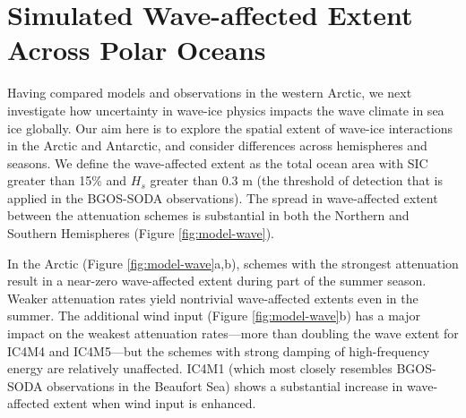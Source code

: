 \documentclass [11pt, proquest] {uwthesis}[2020/02/24]
\begin{document}
\section{Simulated Wave-affected Extent Across Polar Oceans} \label{model-waveextent}


Having compared models and observations in the western Arctic, we next investigate how uncertainty in wave-ice physics impacts the wave climate in sea ice globally. Our aim here is to explore the spatial extent of wave-ice interactions in the Arctic and Antarctic, and consider differences across hemispheres and seasons. We define the wave-affected extent as the total ocean area with SIC greater than 15\% and $H_s$ greater than 0.3 m (the threshold of detection that is applied in the BGOS-SODA observations). The spread in wave-affected extent between the attenuation schemes is substantial in both the Northern and Southern Hemispheres (Figure \ref{fig:model-wave}).  

In the Arctic (Figure \ref{fig:model-wave}a,b), schemes with the strongest attenuation result in a near-zero wave-affected extent during part of the summer season. Weaker attenuation rates yield nontrivial wave-affected extents even in the summer. The additional wind input (Figure \ref{fig:model-wave}b) has a major impact on the weakest attenuation rates---more than doubling the wave extent for IC4M4 and IC4M5---but the schemes with strong damping of high-frequency energy are relatively unaffected. IC4M1 (which most closely resembles BGOS-SODA observations in the Beaufort Sea) shows a substantial increase in wave-affected extent when wind input is enhanced.  
\end{document}
